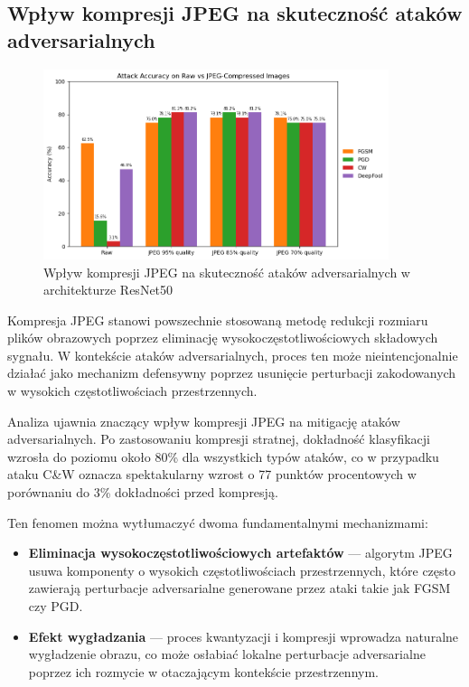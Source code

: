 \documentclass[12pt]{article}
\begin{document}
\subsection{Wpływ kompresji JPEG na skuteczność ataków adversarialnych}

\begin{figure}[H]
    \centering
    \includegraphics[width=0.9\textwidth]{jpeg_accuracy.png}
    \caption{Wpływ kompresji JPEG na skuteczność ataków adversarialnych w architekturze ResNet50}
    \label{fig:jpeg-compression}
\end{figure}

Kompresja JPEG stanowi powszechnie stosowaną metodę redukcji rozmiaru plików obrazowych poprzez eliminację wysokoczęstotliwościowych składowych sygnału. W kontekście ataków adversarialnych, proces ten może nieintencjonalnie działać jako mechanizm defensywny poprzez usunięcie perturbacji zakodowanych w wysokich częstotliwościach przestrzennych.

Analiza ujawnia znaczący wpływ kompresji JPEG na mitigację ataków adversarialnych. Po zastosowaniu kompresji stratnej, dokładność klasyfikacji wzrosła do poziomu około 80\% dla wszystkich typów ataków, co w przypadku ataku C\&W oznacza spektakularny wzrost o 77 punktów procentowych w porównaniu do 3\% dokładności przed kompresją.

Ten fenomen można wytłumaczyć dwoma fundamentalnymi mechanizmami:

\begin{itemize}
    \item \textbf{Eliminacja wysokoczęstotliwościowych artefaktów} --- algorytm JPEG usuwa komponenty o wysokich częstotliwościach przestrzennych, które często zawierają perturbacje adversarialne generowane przez ataki takie jak FGSM czy PGD.
    
    \item \textbf{Efekt wygładzania} --- proces kwantyzacji i kompresji wprowadza naturalne wygładzenie obrazu, co może osłabiać lokalne perturbacje adversarialne poprzez ich rozmycie w otaczającym kontekście przestrzennym.
\end{itemize}
\end{document}
